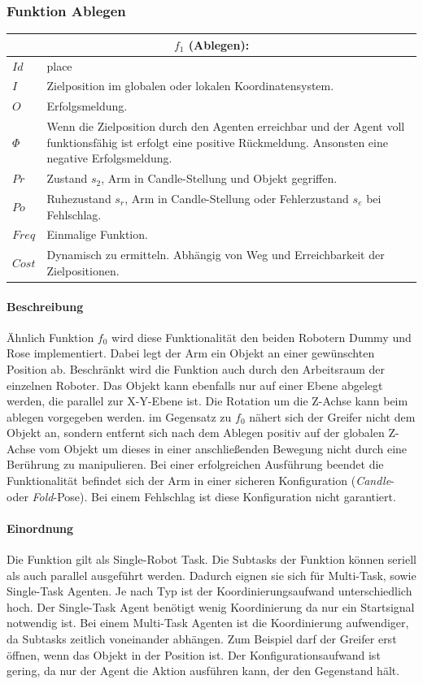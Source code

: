 \subsubsection{Funktion Ablegen}

\begin{tabular}{|p{3cm}|p{10cm}|}
	\multicolumn{2}{c}{$f_1$ (Ablegen):}\\
	\hline  $Id$ & place\\ 
	\hline  $I$ & Zielposition im globalen oder lokalen Koordinatensystem. \\ 
	\hline  $O$ & Erfolgsmeldung. \\ 
	\hline  $\Phi$ & Wenn die Zielposition durch den Agenten erreichbar und der Agent voll funktionsfähig ist erfolgt eine positive Rückmeldung. Ansonsten eine negative Erfolgsmeldung.\\ 
	\hline $Pr$ & Zustand $s_2$, Arm in Candle-Stellung und Objekt gegriffen. \\ 
	\hline $Po$ & Ruhezustand $s_r$, Arm in Candle-Stellung oder Fehlerzustand $s_e$ bei Fehlschlag. \\ 
	\hline $Freq$ & Einmalige Funktion.\\ 
	\hline $Cost$ & Dynamisch zu ermitteln. Abhängig von Weg und Erreichbarkeit der Zielpositionen. \\
	\hline
\end{tabular}

\paragraph{Beschreibung}
Ähnlich Funktion $f_0$ wird diese Funktionalität den beiden Robotern Dummy und Rose implementiert. Dabei legt der Arm ein Objekt an einer gewünschten Position ab. Beschränkt wird die Funktion auch durch den Arbeitsraum der einzelnen Roboter.  Das Objekt kann ebenfalls nur auf einer Ebene abgelegt werden, die parallel zur X-Y-Ebene ist. Die Rotation um die Z-Achse kann beim ablegen vorgegeben werden. im Gegensatz zu $f_0$ nähert sich der Greifer nicht dem Objekt an, sondern entfernt sich nach dem Ablegen positiv auf der globalen Z-Achse vom Objekt um dieses in einer anschließenden Bewegung nicht durch eine Berührung zu manipulieren. Bei einer erfolgreichen Ausführung beendet die Funktionalität befindet sich der Arm in einer sicheren Konfiguration (\textit{Candle}- oder \textit{Fold}-Pose). Bei einem Fehlschlag ist diese Konfiguration nicht garantiert.

\paragraph{Einordnung}
Die Funktion gilt als Single-Robot Task. Die Subtasks der Funktion können seriell als auch parallel ausgeführt werden. Dadurch eignen sie sich für Multi-Task, sowie Single-Task Agenten. Je nach Typ ist der Koordinierungsaufwand unterschiedlich hoch. Der Single-Task Agent benötigt wenig Koordinierung da nur ein Startsignal notwendig ist. Bei einem Multi-Task Agenten ist die Koordinierung aufwendiger, da Subtasks zeitlich voneinander abhängen. Zum Beispiel darf der Greifer erst öffnen, wenn das Objekt in der Position ist. Der Konfigurationsaufwand ist gering, da nur der Agent die Aktion ausführen kann, der den Gegenstand hält. 

